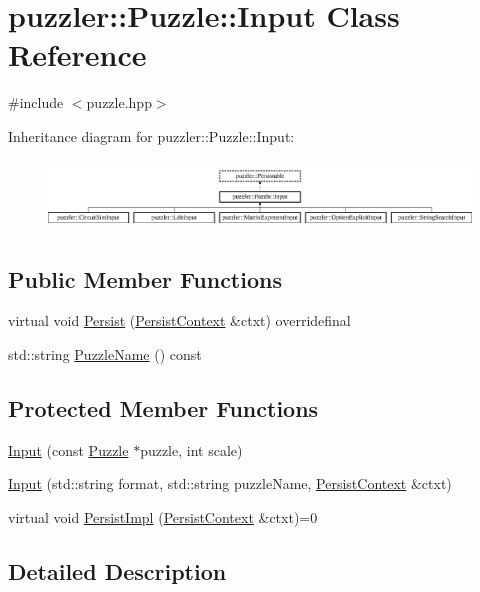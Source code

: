 \hypertarget{a00009}{}\section{puzzler\+:\+:Puzzle\+:\+:Input Class Reference}
\label{a00009}


{\ttfamily \#include $<$puzzle.\+hpp$>$}

Inheritance diagram for puzzler\+:\+:Puzzle\+:\+:Input\+:\begin{figure}[H]
\begin{center}
\leavevmode
\includegraphics[height=1.856354cm]{a00009}
\end{center}
\end{figure}
\subsection*{Public Member Functions}
\begin{DoxyCompactItemize}
\item 
virtual void \hyperlink{a00009_adfd750fef403bc49659f13f5721f3dad}{Persist} (\hyperlink{a00025}{Persist\+Context} \&ctxt) overridefinal
\item 
std\+::string \hyperlink{a00009_aedf5d18b850e3766e9248a439fb106c3}{Puzzle\+Name} () const 
\end{DoxyCompactItemize}
\subsection*{Protected Member Functions}
\begin{DoxyCompactItemize}
\item 
\hyperlink{a00009_a4641f0e6ae428c28fff73d36f519d5df}{Input} (const \hyperlink{a00026}{Puzzle} $\ast$puzzle, int scale)
\item 
\hyperlink{a00009_a2e489ff1925e029f7be03637a85d15a3}{Input} (std\+::string format, std\+::string puzzle\+Name, \hyperlink{a00025}{Persist\+Context} \&ctxt)
\item 
virtual void \hyperlink{a00009_aba0eb4c5656fc660e8746ca68f8f66e5}{Persist\+Impl} (\hyperlink{a00025}{Persist\+Context} \&ctxt)=0
\end{DoxyCompactItemize}


\subsection{Detailed Description}


